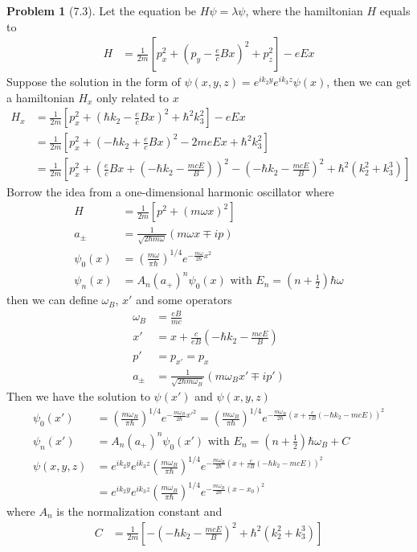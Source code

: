 \documentclass[twoside,11pt]{article}
\theoremstyle{definition}
\newtheorem{problem}{Problem}
\theoremstyle{remark}
\begin{document}
\begin{problem}[7.3]
Let the equation be $H\psi = \lambda\psi$, where the hamiltonian $H$ equals to
\begin{align*}
    H &= \frac{1}{2m} \left[p_x^2 + \left(p_y - \frac{e}{c}Bx\right)^2 + p_z^2
    \right] - eEx
\end{align*}
Suppose the solution in the form of $\psi(x, y, z) = e^{ik_2y}e^{ik_3z}\psi(x)$, then we can get
a hamiltonian $H_x$ only related to $x$
\begin{align*}
    H_x &=
    \frac{1}{2m}\left[
    p_x^2 + \left(\hbar k_2 - \frac{e}{c}Bx\right)^2 + \hbar^2k_3^2
    \right] - eEx\\
    &= \frac{1}{2m}\left[
    p_x^2 + \left(-\hbar k_2 + \frac{e}{c}Bx\right)^2 - 2meEx + \hbar^2k_3^2
    \right]\\
    &= \frac{1}{2m}\left[
    p_x^2 + \left(\frac{e}{c}Bx + (-\hbar k_2 - \frac{mcE}{B})\right)^2
    - (-\hbar k_2-\frac{mcE}{B})^2
    +\hbar^2(k_2^2+k_3^3)
    \right]
\end{align*}
Borrow the idea from a one-dimensional harmonic oscillator where
\begin{align*}
    H &= \frac{1}{2m}[p^2 + (m\omega x)^2]\\
    a_\pm &= \frac{1}{\sqrt{2\hbar m\omega}}(m\omega x \mp ip)\\
    \psi_0(x) &= \left(\frac{m\omega}{\pi\hbar}\right)^{1/4}e^{-\frac{m\omega}{2\hbar}x^2}\\
    \psi_n(x) &= A_n(a_+)^n\psi_0(x) \text{ with } E_n = \left(n + \frac{1}{2}\right)\hbar\omega
\end{align*}
then we can define $\omega_B$, $x'$ and some operators
\begin{align*}
    \omega_B &=  \frac{eB}{mc}\\
    x' &= x + \frac{c}{eB}(-\hbar k_2 - \frac{mcE}{B})\\
    p' &= p_{x'} = p_x\\
    a_\pm &= \frac{1}{\sqrt{2\hbar m\omega_B}}(m\omega_B x' \mp ip')
\end{align*}
Then we have the solution to $\psi(x')$ and $\psi(x, y, z)$
\begin{align*}
    \psi_0(x') &= \left(\frac{m\omega_B}{\pi\hbar}\right)^{1/4}e^{-\frac{m\omega_B}{2\hbar}x'^2}
    = \left(\frac{m\omega_B}{\pi\hbar}\right)^{1/4}e^{-\frac{m\omega_B}{2\hbar}(x+\frac{c}{eB}(-\hbar
    k_2 - mcE))^2}\\
    \psi_n(x') &= A_n(a_+)^n\psi_0(x') \text{ with } E_n = \left(n + \frac{1}{2}\right)\hbar\omega_B + C\\
    \psi(x, y, z) &= e^{ik_2y}e^{ik_3z}
    \left(\frac{m\omega_B}{\pi\hbar}\right)^{1/4}e^{-\frac{m\omega_B}{2\hbar}(x+\frac{c}{eB}(-\hbar
    k_2 - mcE))^2}\\
    &= e^{ik_2y}e^{ik_3z}
    \left(\frac{m\omega_B}{\pi\hbar}\right)^{1/4}e^{-\frac{m\omega_B}{2\hbar}(x-x_0)^2}
\end{align*}
where $A_n$ is the normalization constant and 
\begin{align*}
    C &= \frac{1}{2m}\left[
        - (-\hbar k_2-\frac{mcE}{B})^2
        +\hbar^2(k_2^2+k_3^3)
    \right]
\end{align*}


\end{problem}
\end{document}
